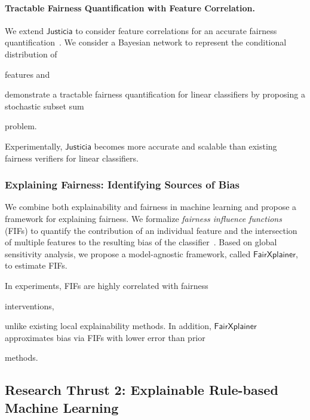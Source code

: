 \documentclass[10pt]{article}
\newif\iflongproposal
\begin{document}
	
	\paragraph{Tractable Fairness Quantification with Feature Correlation.} We extend $\mathsf{Justicia}$ to consider feature correlations for an accurate fairness quantification~\cite{ghosh2022algorithmic}. We consider a Bayesian network to represent the conditional distribution of 
	\iflongproposal
	features\textemdash the SSAT formula grows with the complexity of the Bayesian network, calling for a more scalable solution.	Therefore, we
	\else
	features and
	\fi
	demonstrate a tractable fairness quantification for linear classifiers by proposing a stochastic subset sum 
	\iflongproposal
	problem, which admits an efficient dynamic programming solution with pseudo-polynomial complexity.
	\else
	problem.
	\fi 
	Experimentally, $\mathsf{Justicia}$ becomes more accurate and scalable than existing fairness verifiers for linear classifiers.
	
	
	
	
	
	\subsubsection*{Explaining Fairness: Identifying Sources of Bias}
	We combine both explainability and fairness in machine learning and propose a framework for explaining fairness.  We formalize \textit{fairness influence functions} (FIFs) to quantify the contribution of an individual feature and the intersection of multiple features to the resulting bias of the classifier~\cite{ghosh2022how}. 	Based on global sensitivity analysis, we propose a model-agnostic framework, called $\mathsf{FairXplainer}$, to estimate FIFs. 
	\iflongproposal
	The key idea is to represent fairness metrics using the variance of predictions and apply variance decomposition to compute FIFs.
	\fi
	In experiments, FIFs are highly correlated with fairness  
	\iflongproposal
	interventions and demonstrate a higher granular explanation of unfairness through intersectional influences,
	\else 
	interventions, 
	\fi
	unlike existing local explainability methods. In addition, $\mathsf{FairXplainer}$ approximates bias via FIFs with lower error than prior 
	\iflongproposal
	methods across classifiers such as neural networks and SVMs.
	\else
	methods.
	\fi
	
	

		
	
	\subsection*{Research Thrust 2: Explainable Rule-based Machine Learning}
\end{document}
